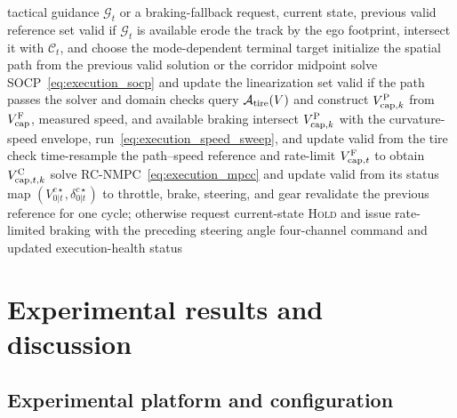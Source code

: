 \documentclass[journal,twoside,web]{ieeecolor}
\begin{document}
\begin{algorithm}[!tbp]
\caption{Sequential SOCP and RC-NMPC Execution}
\label{alg:executor}
\footnotesize
\begin{algorithmic}[1]
\REQUIRE tactical guidance \(\mathcal G_t\) or a braking-fallback request,
current state, previous valid reference
\STATE set valid if $\mathcal G_t$ is available
\STATE erode the track by the ego footprint, intersect it with $\mathcal C_t$,
and choose the mode-dependent terminal target
\STATE initialize the spatial path from the previous valid solution or the
corridor midpoint
\STATE solve SOCP~\eqref{eq:execution_socp} and update the linearization
\ENDFOR
\STATE set valid if the path passes the solver and domain checks
\ENDIF
{}
\STATE query $\mathcal A_{\rm tire}(V)$ and construct
$V_{{\rm cap},k}^{\rm P}$ from $V_{\rm cap}^{\rm F}$, measured speed, and
available braking
\STATE intersect $V_{{\rm cap},k}^{\rm P}$ with the curvature-speed envelope,
run~\eqref{eq:execution_speed_sweep}, and update valid from the tire check
\ENDIF
{}
\STATE time-resample the path--speed reference and rate-limit
$V_{{\rm cap},t}^{\rm F}$ to obtain $V_{{\rm cap},t,k}^{\rm C}$
\STATE solve RC-NMPC~\eqref{eq:execution_mpcc} and update valid from its status
\ENDIF
{}
\STATE map $(V_{0|t}^{c\star},\delta_{0|t}^{c\star})$ to throttle, brake,
steering, and gear
\ELSE
\STATE revalidate the previous reference for one cycle; otherwise request
current-state \textsc{Hold} and issue rate-limited braking with the preceding
steering angle
\ENDIF
\RETURN four-channel command and updated execution-health status
\end{algorithmic}
\end{algorithm}
\endgroup


\section{Experimental results and discussion}\label{sec:experiments}

\subsection{Experimental platform and configuration}
\label{subsec:hil_env}\label{subsec:param_setup}
\end{document}
